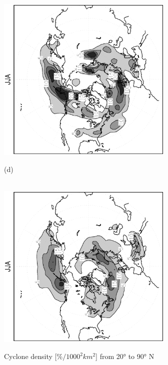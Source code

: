 \documentclass[12pt,a4paper,twoside,openright,headinclude,liststotoc,bibtotoc]{scrreprt}
\begin{document}
\begin{figure}[c]
{\includegraphics[height=8.0cm,angle=-90]
{eps/cycldensity_PLASIM_T21_45JJA.eps}
}
\parbox{8.5cm}{\hspace{0.95cm}\begin{scriptsize}(d)\end{scriptsize} \vspace{-0.5cm} \\
\includegraphics[height=8.0cm,angle=-90]
{eps/cycldensity_ERA40_T21_45JJA.eps}
}
\caption[Cyclone density Northern Hemisphere]{Cyclone density [$\%/1000^2 km^2$] from 20° to 90° N}
\label{img:NHcyclden}
\end{figure}
\end{document}
